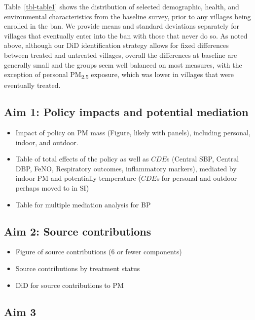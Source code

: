 \documentclass[
  letterpaper,
  DIV=11,
  numbers=noendperiod]{scrartcl}
\providecommand{\tightlist}{%
  \setlength{\itemsep}{0pt}\setlength{\parskip}{0pt}}\usepackage{longtable,booktabs,array}
\begin{document}
Table~\ref{tbl-table1} shows the distribution of selected demographic,
health, and environmental characteristics from the baseline survey,
prior to any villages being enrolled in the ban. We provide means and
standard deviations separately for villages that eventually enter into
the ban with those that never do so. As noted above, although our DiD
identification strategy allows for fixed differences between treated and
untreated villages, overall the differences at baseline are generally
small and the groups seem well balanced on most measures, with the
exception of personal PM\textsubscript{2.5} exposure, which was lower in
villages that were eventually treated.

\subsection{Aim 1: Policy impacts and potential
mediation}\label{aim-1-policy-impacts-and-potential-mediation}

\begin{itemize}
\tightlist
\item
  Impact of policy on PM mass (Figure, likely with panels), including
  personal, indoor, and outdoor.
\item
  Table of total effects of the policy as well as \(CDE\)s (Central SBP,
  Central DBP, FeNO, Respiratory outcomes, inflammatory markers),
  mediated by indoor PM and potentially temperature (\(CDE\)s for
  personal and outdoor perhaps moved to in SI)
\item
  Table for multiple mediation analysis for BP
\end{itemize}

\subsection{Aim 2: Source
contributions}\label{aim-2-source-contributions}

\begin{itemize}
\tightlist
\item
  Figure of source contributions (6 or fewer components)
\item
  Source contributions by treatment status
\item
  DiD for source contributions to PM
\end{itemize}

\subsection{Aim 3}\label{aim-3}
\end{document}
